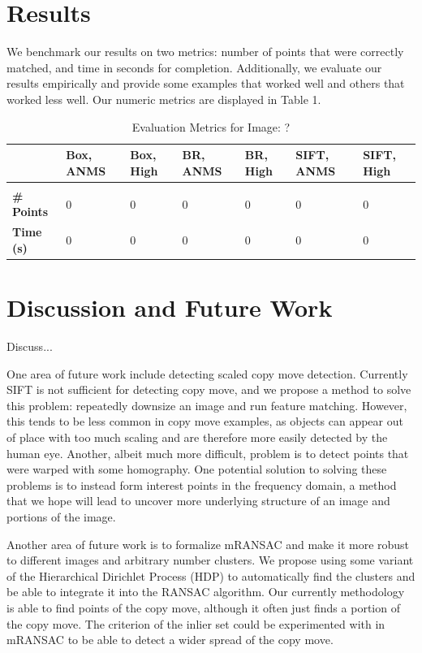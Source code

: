 \documentclass[12pt]{article}
\begin{document}
\section*{Results}

We benchmark our results on two metrics: number of points that were correctly matched, and time in seconds for completion. Additionally, we evaluate our results empirically and provide some examples that worked well and others that worked less well. Our numeric metrics are displayed in Table 1. 

\begin{table}[t]
\caption{Evaluation Metrics for Image: ?}
\label{image}
\begin{center}
\begin{tabular}{l|llllll}
\multicolumn{1}{l}{} & \multicolumn{1}{l}{\bf Box, ANMS} & \multicolumn{1}{l}{\bf Box, High} & \multicolumn{1}{l}{\bf BR, ANMS} & \multicolumn{1}{l}{\bf BR, High} & \multicolumn{1}{l}{\bf SIFT, ANMS} & \multicolumn{1}{l}{\bf SIFT, High}
\\ \hline \\
{\bf \# Points} & 0 & 0 & 0 & 0 & 0 & 0 \\
{\bf Time (s)} & 0 & 0 & 0 & 0 & 0 & 0 \\
\end{tabular}
\end{center}
\end{table}

\section*{Discussion and Future Work}

Discuss...

One area of future work include detecting scaled copy move detection. Currently SIFT is not sufficient for detecting copy move, and we propose a method to solve this problem: repeatedly downsize an image and run feature matching. However, this tends to be less common in copy move examples, as objects can appear out of place with too much scaling and are therefore more easily detected by the human eye. Another, albeit much more difficult, problem is to detect points that were warped with some homography. One potential solution to solving these problems is to instead form interest points in the frequency domain, a method that we hope will lead to uncover more underlying structure of an image and portions of the image. 

Another area of future work is to formalize mRANSAC and make it more robust to different images and arbitrary number clusters. We propose using some variant of the Hierarchical Dirichlet Process (HDP) to automatically find the clusters and be able to integrate it into the RANSAC algorithm. Our currently methodology is able to find points of the copy move, although it often just finds a portion of the copy move. The criterion of the inlier set could be experimented with in mRANSAC to be able to detect a wider spread of the copy move. 
\end{document}
